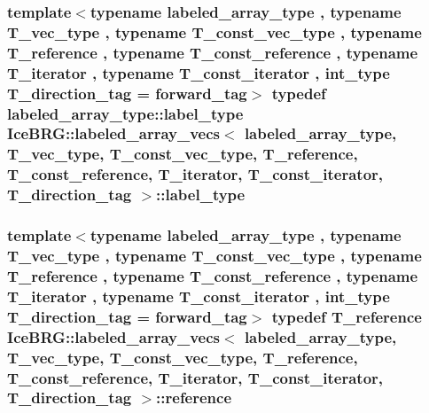 \subsubsection[{label\+\_\+type}]{\setlength{\rightskip}{0pt plus 5cm}template$<$typename labeled\+\_\+array\+\_\+type , typename T\+\_\+vec\+\_\+type , typename T\+\_\+const\+\_\+vec\+\_\+type , typename T\+\_\+reference , typename T\+\_\+const\+\_\+reference , typename T\+\_\+iterator , typename T\+\_\+const\+\_\+iterator , int\+\_\+type T\+\_\+direction\+\_\+tag = forward\+\_\+tag$>$ typedef labeled\+\_\+array\+\_\+type\+::label\+\_\+type {\bf Ice\+B\+R\+G\+::labeled\+\_\+array\+\_\+vecs}$<$ labeled\+\_\+array\+\_\+type, T\+\_\+vec\+\_\+type, T\+\_\+const\+\_\+vec\+\_\+type, T\+\_\+reference, T\+\_\+const\+\_\+reference, T\+\_\+iterator, T\+\_\+const\+\_\+iterator, T\+\_\+direction\+\_\+tag $>$\+::{\bf label\+\_\+type}}\label{classIceBRG_1_1labeled__array__vecs_a2bbe62200750107fc665bd86753bff4f}
\hypertarget{classIceBRG_1_1labeled__array__vecs_a83e2aad33d65d344a7df84aab091e48d}{}
\subsubsection[{reference}]{\setlength{\rightskip}{0pt plus 5cm}template$<$typename labeled\+\_\+array\+\_\+type , typename T\+\_\+vec\+\_\+type , typename T\+\_\+const\+\_\+vec\+\_\+type , typename T\+\_\+reference , typename T\+\_\+const\+\_\+reference , typename T\+\_\+iterator , typename T\+\_\+const\+\_\+iterator , int\+\_\+type T\+\_\+direction\+\_\+tag = forward\+\_\+tag$>$ typedef T\+\_\+reference {\bf Ice\+B\+R\+G\+::labeled\+\_\+array\+\_\+vecs}$<$ labeled\+\_\+array\+\_\+type, T\+\_\+vec\+\_\+type, T\+\_\+const\+\_\+vec\+\_\+type, T\+\_\+reference, T\+\_\+const\+\_\+reference, T\+\_\+iterator, T\+\_\+const\+\_\+iterator, T\+\_\+direction\+\_\+tag $>$\+::{\bf reference}}\label{classIceBRG_1_1labeled__array__vecs_a83e2aad33d65d344a7df84aab091e48d}
\hypertarget{classIceBRG_1_1labeled__array__vecs_ab3d90428e6ba03e8a3bcb3b44629e3f5}{}

